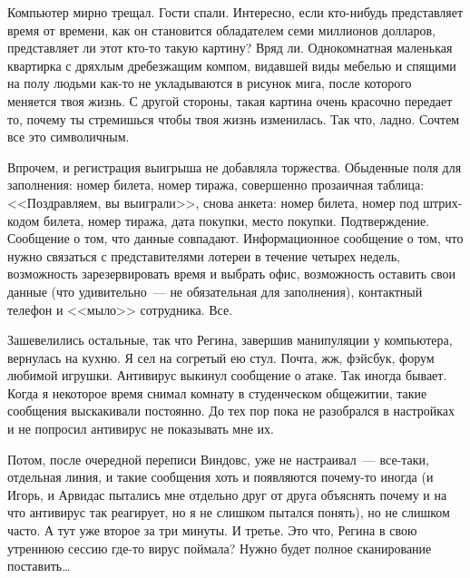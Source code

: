 Компьютер мирно трещал. Гости спали. Интересно, если кто-нибудь представляет 
время от времени, как он становится обладателем семи миллионов долларов, 
представляет ли этот кто-то такую картину? Вряд ли. Однокомнатная маленькая 
квартирка с дряхлым дребезжащим компом, видавшей виды мебелью и спящими на полу 
людьми как-то не укладываются в рисунок мига, после которого меняется твоя 
жизнь. С другой стороны, такая картина очень красочно передает то, почему ты 
стремишься чтобы твоя жизнь изменилась. Так что, ладно. Сочтем все это 
символичным.

Впрочем, и регистрация выигрыша не добавляла торжества. Обыденные поля для 
заполнения: номер билета, номер тиража, совершенно прозаичная таблица: 
<<Поздравляем, вы выиграли>>, снова анкета: номер билета, номер под штрих-кодом 
билета, номер тиража, дата покупки, место покупки. Подтверждение. Сообщение о 
том, что данные совпадают. Информационное сообщение о том, что нужно связаться 
с представителями лотереи в течение четырех недель, возможность зарезервировать 
время и выбрать офис, возможность оставить свои данные (что удивительно~--- не 
обязательная для заполнения), контактный телефон и <<мыло>> сотрудника. Все.

Зашевелились остальные, так что Регина, завершив манипуляции у компьютера, 
вернулась на кухню. Я сел на согретый ею стул. Почта, жж, фэйсбук, форум 
любимой игрушки. Антивирус выкинул сообщение о атаке. Так иногда бывает. Когда я 
некоторое время снимал комнату в студенческом общежитии, такие сообщения 
выскакивали постоянно. До тех пор пока не разобрался в настройках и не попросил 
антивирус не показывать мне их.

Потом, после очередной переписи Виндовс, уже не настраивал~--- все-таки, 
отдельная линия, и такие сообщения хоть и появляются почему-то иногда (и Игорь, и Арвидас 
пытались мне отдельно друг от друга объяснять почему и на что антивирус так 
реагирует, но я не слишком пытался понять), но не слишком часто. А тут уже 
второе за три минуты. И третье. Это что, Регина в свою утреннюю сессию где-то 
вирус поймала? Нужно будет полное сканирование поставить\ldots

